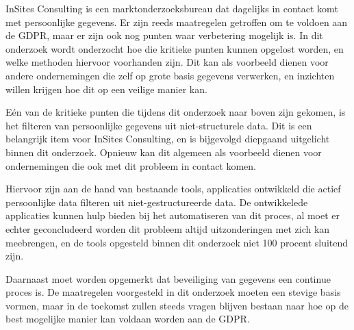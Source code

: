 InSites Consulting is een marktonderzoeksbureau dat dagelijks in contact komt met persoonlijke gegevens. Er zijn reeds maatregelen getroffen om te voldoen aan de GDPR, maar er zijn ook nog punten waar verbetering mogelijk is. In dit onderzoek wordt onderzocht hoe die kritieke punten kunnen opgelost worden, en welke methoden hiervoor voorhanden zijn. Dit kan als voorbeeld dienen voor andere ondernemingen die zelf op grote basis gegevens verwerken, en inzichten willen krijgen hoe dit op een veilige manier kan. 

Eén van de kritieke punten die tijdens dit onderzoek naar boven zijn gekomen, is het filteren van persoonlijke gegevens uit niet-structurele data. Dit is een belangrijk item voor InSites Consulting, en is bijgevolgd diepgaand uitgelicht binnen dit onderzoek. Opnieuw kan dit algemeen als voorbeeld dienen voor ondernemingen die ook met dit probleem in contact komen.

Hiervoor zijn aan de hand van bestaande tools, applicaties ontwikkeld die actief persoonlijke data filteren uit niet-gestructureerde data. De ontwikkelede applicaties kunnen hulp bieden bij het automatiseren van dit proces, al moet er echter geconcludeerd worden dit probleem altijd uitzonderingen met zich kan meebrengen, en de tools opgesteld binnen dit onderzoek niet 100 procent sluitend zijn. 

Daarnaast moet worden opgemerkt dat beveiliging van gegevens een continue proces is. De maatregelen voorgesteld in dit onderzoek moeten een stevige basis vormen, maar in de toekomst zullen steeds vragen blijven bestaan naar hoe op de best mogelijke manier kan voldaan worden aan de GDPR. 
